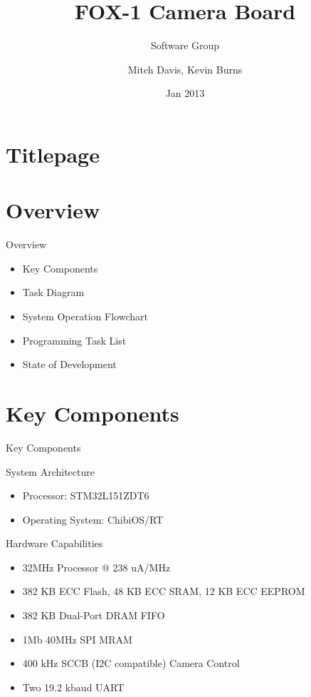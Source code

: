 \documentclass{beamer}
\author{Mitch Davis, Kevin Burns}
\title{FOX-1 Camera Board}
\subtitle{Software Group}
\institute{Virginia Tech}
\date{Jan 2013}
\begin{document}
\section{Titlepage}
\begin{frame}
\titlepage
\end{frame}

\section{Overview}
\begin{frame}{Overview}
	\begin{itemize}
		\item Key Components
		\item Task Diagram
		\item System Operation Flowchart
		\item Programming Task List
		\item State of Development
	\end{itemize}
\end{frame}

\section{Key Components}
\begin{frame}{Key Components}
	\begin{block}{System Architecture}
		\begin{itemize}
			\item Processor: STM32L151ZDT6
			\item Operating System: ChibiOS/RT
		\end{itemize}
	\end{block}
	\begin{block}{Hardware Capabilities}
		\begin{itemize}
			\item 32MHz Processor @ 238 uA/MHz
			\item 382 KB ECC Flash, 48 KB ECC SRAM, 12 KB ECC EEPROM
			\item 382 KB Dual-Port DRAM FIFO
			\item 1Mb 40MHz SPI MRAM
			\item 400 kHz SCCB (I2C compatible) Camera Control
			\item Two 19.2 kbaud UART
		\end{itemize}
	\end{block}
\end{frame}
\end{document}
